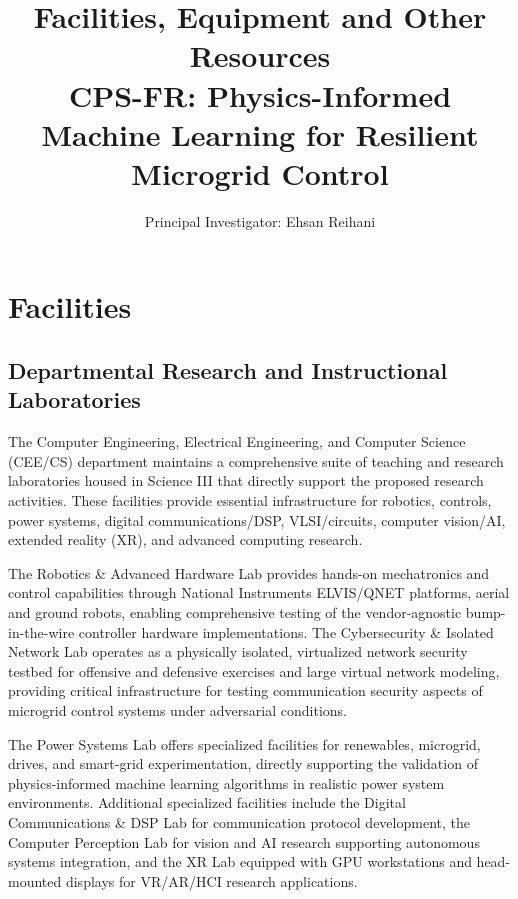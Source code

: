 \documentclass[12pt]{article}
\begin{document}
\title{\Large\textbf{Facilities, Equipment and Other Resources\\CPS-FR: Physics-Informed Machine Learning for Resilient Microgrid Control}}
\author{Principal Investigator: Ehsan Reihani}
\date{}

\maketitle

\section{Facilities}

\subsection{Departmental Research and Instructional Laboratories}

The Computer Engineering, Electrical Engineering, and Computer Science (CEE/CS) department maintains a comprehensive suite of teaching and research laboratories housed in Science III that directly support the proposed research activities. These facilities provide essential infrastructure for robotics, controls, power systems, digital communications/DSP, VLSI/circuits, computer vision/AI, extended reality (XR), and advanced computing research.

The Robotics \& Advanced Hardware Lab provides hands-on mechatronics and control capabilities through National Instruments ELVIS/QNET platforms, aerial and ground robots, enabling comprehensive testing of the vendor-agnostic bump-in-the-wire controller hardware implementations. The Cybersecurity \& Isolated Network Lab operates as a physically isolated, virtualized network security testbed for offensive and defensive exercises and large virtual network modeling, providing critical infrastructure for testing communication security aspects of microgrid control systems under adversarial conditions.

The Power Systems Lab offers specialized facilities for renewables, microgrid, drives, and smart-grid experimentation, directly supporting the validation of physics-informed machine learning algorithms in realistic power system environments. Additional specialized facilities include the Digital Communications \& DSP Lab for communication protocol development, the Computer Perception Lab for vision and AI research supporting autonomous systems integration, and the XR Lab equipped with GPU workstations and head-mounted displays for VR/AR/HCI research applications.
\end{document}

